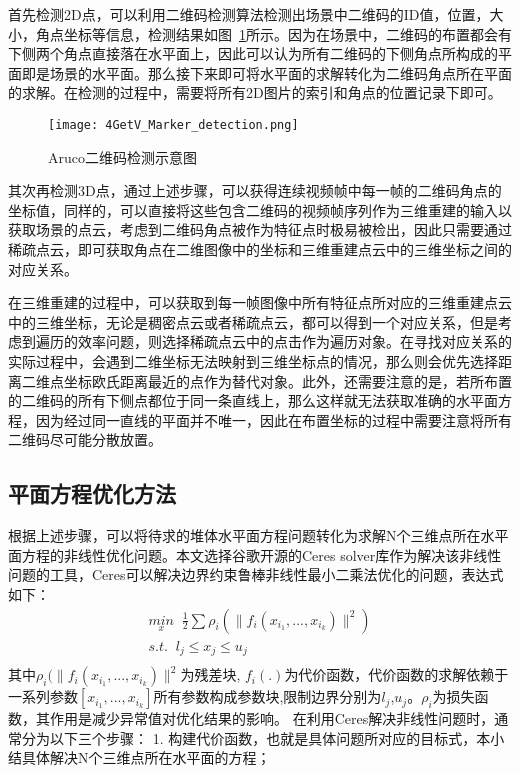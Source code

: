 首先检测2D点，可以利用二维码检测算法检测出场景中二维码的ID值，位置，大小，角点坐标等信息，检测结果如图~\ref{fig:4GetV_Marker_detection}所示。因为在场景中，二维码的布置都会有下侧两个角点直接落在水平面上，因此可以认为所有二维码的下侧角点所构成的平面即是场景的水平面。那么接下来即可将水平面的求解转化为二维码角点所在平面的求解。在检测的过程中，需要将所有2D图片的索引和角点的位置记录下即可。
\begin{figure}[H] %
  \centering
  \texttt{[image: 4GetV\_Marker\_detection.png]}
  \caption{Aruco二维码检测示意图}
  \label{fig:4GetV_Marker_detection}
\end{figure}
其次再检测3D点，通过上述步骤，可以获得连续视频帧中每一帧的二维码角点的坐标值，同样的，可以直接将这些包含二维码的视频帧序列作为三维重建的输入以获取场景的点云，考虑到二维码角点被作为特征点时极易被检出，因此只需要通过稀疏点云，即可获取角点在二维图像中的坐标和三维重建点云中的三维坐标之间的对应关系。

在三维重建的过程中，可以获取到每一帧图像中所有特征点所对应的三维重建点云中的三维坐标，无论是稠密点云或者稀疏点云，都可以得到一个对应关系，但是考虑到遍历的效率问题，则选择稀疏点云中的点击作为遍历对象。在寻找对应关系的实际过程中，会遇到二维坐标无法映射到三维坐标点的情况，那么则会优先选择距离二维点坐标欧氏距离最近的点作为替代对象。此外，还需要注意的是，若所布置的二维码的所有下侧点都位于同一条直线上，那么这样就无法获取准确的水平面方程，因为经过同一直线的平面并不唯一，因此在布置坐标的过程中需要注意将所有二维码尽可能分散放置。
\subsection{平面方程优化方法}
\label{sec:4.2.2}
根据上述步骤，可以将待求的堆体水平面方程问题转化为求解N个三维点所在水平面方程的非线性优化问题。本文选择谷歌开源的Ceres solver库作为解决该非线性问题的工具，Ceres可以解决边界约束鲁棒非线性最小二乘法优化的问题，表达式如下：
\begin{equation}
\begin{array}{l}\underset x{min}\;\;\frac12\sum\rho_i(\parallel f_i(x_{i_1},...,x_{i_k})\parallel^2)
\\s.t.\;\;l_j\leq x_j\leq u_j\\\end{array}
\end{equation}
其中$\rho_i(\parallel f_i(x_{i_1},...,x_{i_k})\parallel^2$为残差块, $f_i(.)$为代价函数，代价函数的求解依赖于一系列参数$[x_{i_1},...,x_{i_k}]$所有参数构成参数块,限制边界分别为$l_j$,$u_j$。$\rho_i$为损失函数，其作用是减少异常值对优化结果的影响。
在利用Ceres解决非线性问题时，通常分为以下三个步骤：
1. 构建代价函数，也就是具体问题所对应的目标式，本小结具体解决N个三维点所在水平面的方程；

